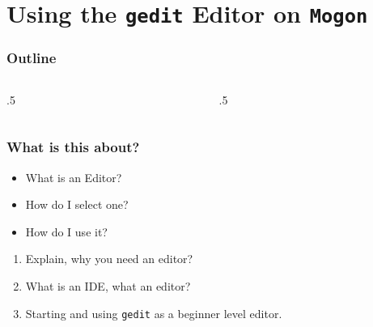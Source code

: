 \section{Using the \texttt{gedit} Editor on \texttt{Mogon}}

\ifdefined\ishandout
{
	\frame{
		\tableofcontents[currentsection]
	}
}
\else
\begin{frame}
	\frametitle{Outline}
	\begin{columns}[t]
		\begin{column}{.5\textwidth}
			\tableofcontents[sections={1-9},currentsection]
		\end{column}
		\begin{column}{.5\textwidth}
			\tableofcontents[sections={10-18},currentsection]
		\end{column}
	\end{columns}
\end{frame}
\fi

\begin{frame}
	\frametitle{What is this about?}
	\begin{question}[Questions]\begin{itemize}
			\item What is an Editor?
			\item How do I select one?
			\item How do I use it?
		\end{itemize}
	\end{question}
	\begin{docs}[Objectives]
		\begin{enumerate}
			\item Explain, why you need an editor?
			\item What is an IDE, what an editor?
			\item Starting and using \texttt{gedit} as a beginner level editor.
		\end{enumerate}
	\end{docs}
\end{frame}

